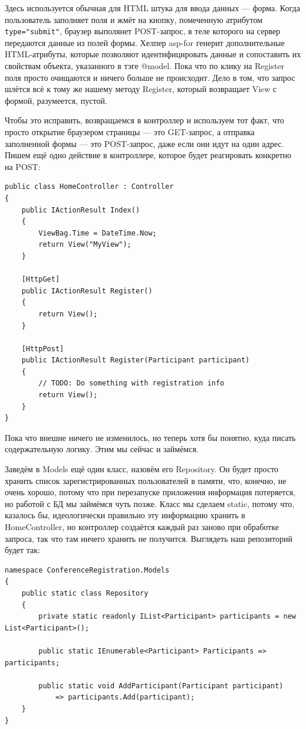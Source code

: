 \documentclass[a5paper]{article}
\begin{document}
Здесь используется обычная для HTML штука для ввода данных --- форма. Когда пользователь заполняет поля и жмёт на кнопку, помеченную атрибутом \verb|type="submit"|, браузер выполянет POST-запрос, в теле которого на сервер передаются данные из полей формы. Хелпер asp-for генерит дополнительные
HTML-атрибуты, которые позволяют идентифицировать данные и сопоставить их свойствам объекта, указанного в тэге @model. Пока что по клику на Register поля просто очищаются и ничего больше не происходит. 
Дело в том, что запрос шлётся всё к тому же нашему методу Register, который возвращает View с формой, разумеется, пустой.

Чтобы это исправить, возвращаемся в контроллер и используем тот факт, что просто открытие браузером страницы --- это GET-запрос, а отправка заполненной формы --- это POST-запрос, даже если они идут на один адрес. Пишем ещё одно действие в контроллере, которое будет реагировать конкретно
на POST:

\begin{verbatim}
public class HomeController : Controller
{
    public IActionResult Index()
    {
        ViewBag.Time = DateTime.Now;
        return View("MyView");
    }

    [HttpGet]
    public IActionResult Register()
    {
        return View();
    }

    [HttpPost]
    public IActionResult Register(Participant participant)
    {
        // TODO: Do something with registration info
        return View();
    }
}
\end{verbatim}

Пока что внешне ничего не изменилось, но теперь хотя бы понятно, куда писать содержательную логику. Этим мы сейчас и займёмся. 

Заведём в Models ещё один класс, назовём его Repository. Он будет просто хранить список зарегистрированных пользователей в памяти, что, конечно, не очень хорошо, потому что при перезапуске приложения информация потеряется, но работой с БД мы займёмся чуть позже.
Класс мы сделаем static, потому что, казалось бы, идеологически правильно эту информацию хранить в HomeController, но контроллер создаётся каждый раз заново при обработке запроса, так что там ничего хранить не получится.
Выглядеть наш репозиторий будет так:

\begin{verbatim}
namespace ConferenceRegistration.Models
{
    public static class Repository
    {
        private static readonly IList<Participant> participants = new List<Participant>();

        public static IEnumerable<Participant> Participants => participants;

        public static void AddParticipant(Participant participant) 
            => participants.Add(participant);
    }
}
\end{verbatim}
\end{document}
